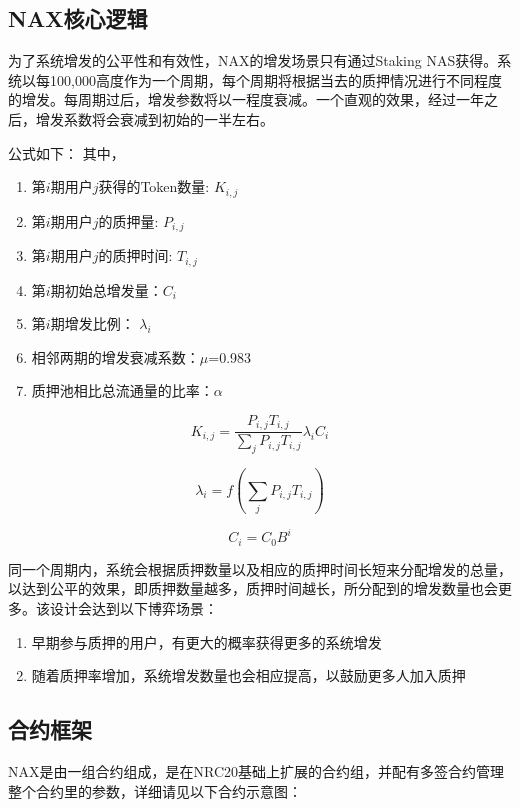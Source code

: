\subsection{NAX核心逻辑}
为了系统增发的公平性和有效性，NAX的增发场景只有通过Staking NAS获得。系统以每100,000高度作为一个周期，每个周期将根据当去的质押情况进行不同程度的增发。每周期过后，增发参数将以一程度衰减。一个直观的效果，经过一年之后，增发系数将会衰减到初始的一半左右。

公式如下：
其中，

\begin{enumerate}
   \item 第\(i\)期用户\(j\)获得的Token数量: \(K_{i,j}\)
   \item 第\(i\)期用户\(j\)的质押量: \(P_{i,j}\)
   \item 第\(i\)期用户\(j\)的质押时间: \(T_{i,j}\)
   \item 第\(i\)期初始总增发量：\(C_i\)
   \item 第\(i\)期增发比例： \(\lambda_i\)
   \item 相邻两期的增发衰减系数：$\mu$=0.983
   \item 质押池相比总流通量的比率：$\alpha$
\end{enumerate}

\begin{equation}
  K_{i,j} = \frac{P_{i,j} T_{i,j}}{\sum_j P_{i,j} T_{i,j}} \lambda_i C_i
\end{equation}

\begin{equation}
  \lambda_i = f(\sum_j P_{i,j} T_{i,j})
\end{equation}

\begin{equation}
  C_i = C_0 B^i
\end{equation}

同一个周期内，系统会根据质押数量以及相应的质押时间长短来分配增发的总量，以达到公平的效果，即质押数量越多，质押时间越长，所分配到的增发数量也会更多。该设计会达到以下博弈场景：
\begin{enumerate}
	\item 早期参与质押的用户，有更大的概率获得更多的系统增发
	\item 随着质押率增加，系统增发数量也会相应提高，以鼓励更多人加入质押
\end{enumerate}

\subsection{合约框架}
NAX是由一组合约组成，是在NRC20基础上扩展的合约组，并配有多签合约管理整个合约里的参数，详细请见以下合约示意图：

